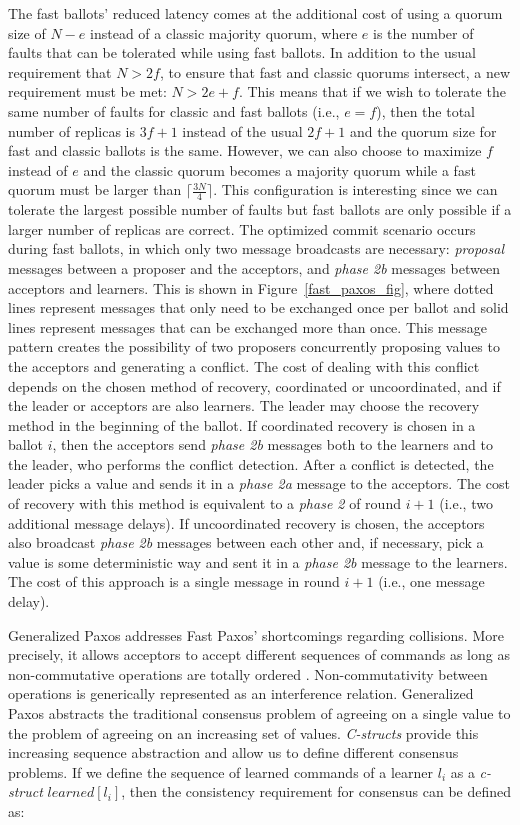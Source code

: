 The fast ballots' reduced latency comes at the additional cost of using a quorum size of $N-e$ instead of a classic majority quorum, where $e$ is the number of faults that can be tolerated while using fast ballots. In addition to the usual requirement that $N> 2f$, to ensure that fast and classic quorums intersect, a new requirement must be met: $N > 2e+f$. This means that if we wish to tolerate the same number of faults for classic and fast ballots (i.e., $e=f$), then the total number of replicas is $3f+1$ instead of the usual $2f+1$ and the quorum size for fast and classic ballots is the same. However, we can also choose to maximize $f$ instead of $e$ and the classic quorum becomes a majority quorum while a fast quorum must be larger than $\lceil \frac{3N}{4} \rceil$. This configuration is interesting since we can tolerate the largest possible number of faults but fast ballots are only possible if a larger number of replicas are correct. The optimized commit scenario occurs during fast ballots, in which only two message broadcasts are necessary: \textit{proposal} messages between a proposer and the acceptors, and \textit{phase 2b} messages between acceptors and learners. This is shown in Figure~\ref{fast_paxos_fig}, where dotted lines represent messages that only need to be exchanged once per ballot and solid lines represent messages that can be exchanged more than once. This message pattern creates the possibility of two proposers concurrently proposing values to the acceptors and generating a conflict. The cost of dealing with this conflict depends on the chosen method of recovery, coordinated or uncoordinated, and if the leader or acceptors are also learners. The leader may choose  the recovery method in the beginning of the ballot. If coordinated recovery is chosen in a ballot $i$, then the acceptors send \textit{phase 2b} messages both to the learners and to the leader, who performs the conflict detection. After a conflict is detected, the leader picks a value and sends it in a \textit{phase 2a} message to the acceptors. The cost of recovery with this method is equivalent to a \textit{phase 2} of round $i+1$ (i.e., two additional message delays). If uncoordinated recovery is chosen, the acceptors also broadcast \textit{phase 2b} messages between each other and, if necessary, pick a value is some deterministic way and sent it in a \textit{phase 2b} message to the learners. The cost of this approach is a single message in round $i+1$ (i.e., one message delay). \par
Generalized Paxos addresses Fast Paxos' shortcomings regarding collisions. More precisely, it allows acceptors to accept different sequences of commands as long as non-commutative operations are totally ordered \cite{Lamport2005}.  Non-commutativity between operations is generically represented as an interference relation. Generalized Paxos abstracts the traditional consensus problem of agreeing on a single value to the problem of agreeing on an increasing set of values. \textit{C-structs} provide this increasing sequence abstraction and allow us to define different consensus problems. If we define the sequence of learned commands of a learner $l_i$ as a \textit{c-struct} $learned[l_i]$, then the consistency requirement for consensus can be defined as:\par
